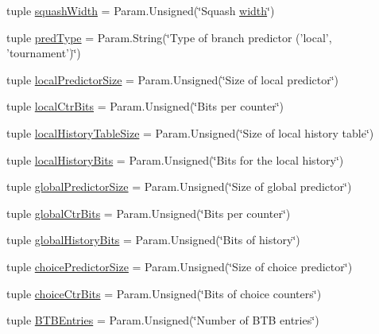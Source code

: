 \begin{DoxyCompactItemize}
\item 
tuple \hyperlink{classOzoneCPU_1_1DerivOzoneCPU_a822a947e7bb7034547d91ec80d337303}{squashWidth} = Param.Unsigned(\char`\"{}Squash \hyperlink{classOzoneCPU_1_1DerivOzoneCPU_a397bb3beea7b21f074bc75e1e71f132f}{width}\char`\"{})
\item 
tuple \hyperlink{classOzoneCPU_1_1DerivOzoneCPU_a21f1c740ec019f8327179a37b26cc7a3}{predType} = Param.String(\char`\"{}Type of branch predictor ('local', 'tournament')\char`\"{})
\item 
tuple \hyperlink{classOzoneCPU_1_1DerivOzoneCPU_ac2af65faa5d32c894af40e4477fbfe65}{localPredictorSize} = Param.Unsigned(\char`\"{}Size of local predictor\char`\"{})
\item 
tuple \hyperlink{classOzoneCPU_1_1DerivOzoneCPU_a2da1de2b433849a9666f13cf821c1539}{localCtrBits} = Param.Unsigned(\char`\"{}Bits per counter\char`\"{})
\item 
tuple \hyperlink{classOzoneCPU_1_1DerivOzoneCPU_a711db16eca8627517aca59fb2aa5565b}{localHistoryTableSize} = Param.Unsigned(\char`\"{}Size of local history table\char`\"{})
\item 
tuple \hyperlink{classOzoneCPU_1_1DerivOzoneCPU_abc8222dc26502ccba1f3eadbb2663bc0}{localHistoryBits} = Param.Unsigned(\char`\"{}Bits for the local history\char`\"{})
\item 
tuple \hyperlink{classOzoneCPU_1_1DerivOzoneCPU_ae96feffd947249a9c9cd50de8d89ef9e}{globalPredictorSize} = Param.Unsigned(\char`\"{}Size of global predictor\char`\"{})
\item 
tuple \hyperlink{classOzoneCPU_1_1DerivOzoneCPU_a94aef0cf23359796beb413a3078186ef}{globalCtrBits} = Param.Unsigned(\char`\"{}Bits per counter\char`\"{})
\item 
tuple \hyperlink{classOzoneCPU_1_1DerivOzoneCPU_af5dcca0868471669d21af0002ce7abd7}{globalHistoryBits} = Param.Unsigned(\char`\"{}Bits of history\char`\"{})
\item 
tuple \hyperlink{classOzoneCPU_1_1DerivOzoneCPU_acd59ddeaa888aee8a086f93d0ce0afbc}{choicePredictorSize} = Param.Unsigned(\char`\"{}Size of choice predictor\char`\"{})
\item 
tuple \hyperlink{classOzoneCPU_1_1DerivOzoneCPU_ae5455b064804378b4ec6f8094452896d}{choiceCtrBits} = Param.Unsigned(\char`\"{}Bits of choice counters\char`\"{})
\item 
tuple \hyperlink{classOzoneCPU_1_1DerivOzoneCPU_af08b7bde310be401d556775d6f7022c8}{BTBEntries} = Param.Unsigned(\char`\"{}Number of BTB entries\char`\"{})
\item 

\end{DoxyCompactItemize}
